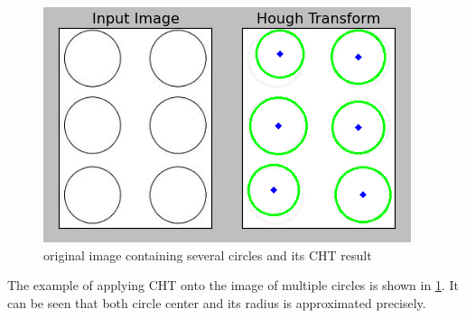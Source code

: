 \documentclass[extendedabs]{bmvc2k}
\begin{document}
\begin{figure}[h]
    \centering
    \includegraphics[width=\linewidth]{hw4_4_4}
    \caption{original image containing several circles and its CHT result}
    \label{fig:9}
\end{figure}

The example of applying CHT onto the image of multiple circles is shown in \figurename{\ref{fig:9}}. It can be 
seen that both circle center and its radius is approximated precisely.
\end{document}
